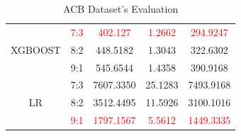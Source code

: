 \documentclass{ieeeojies}
\begin{document}
\begin{table}[H]
\begin{tabular}{|c|c|c|c|c|}
\hline
\multirow{3}{*}{\centering XGBOOST} & \textcolor{red}{7:3} & \textcolor{red}{402.127} & \textcolor{red}{1.2662} & \textcolor{red}{294.9247} \\
       & 8:2 & 448.5182 & 1.3043 & 322.6302 \\
       & 9:1 & 545.6544 & 1.4358 & 390.9168 \\
\hline
\multirow{3}{*}{\centering LR}    & 7:3 & 7607.3350 & 25.1283 & 7493.9168 \\
     & 8:2 & 3512.4495 & 11.5926 & 3100.1016 \\
     & \textcolor{red}{9:1} & \textcolor{red}{1797.1567} & \textcolor{red}{5.5612} & \textcolor{red}{1449.3335} \\
\hline
    \end{tabular}
    \caption{ACB Dataset's Evaluation}
    \label{vcbdataset}
\end{table}
\end{document}
